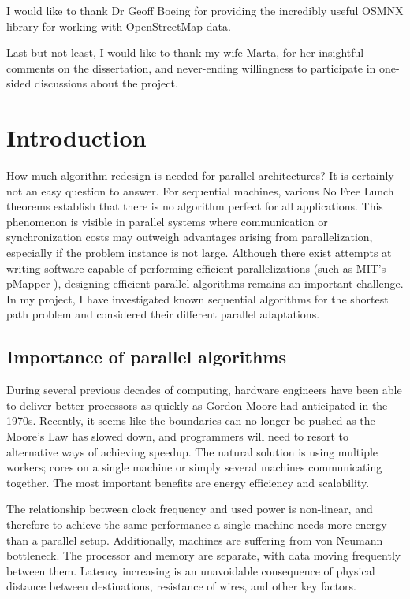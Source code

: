 \documentclass[12pt,a4paper,twoside,openright]{report}
\begin{document}
I would like to thank Dr Geoff Boeing for providing the incredibly useful OSMNX library for working with OpenStreetMap data\cite{Boeing2017}.

Last but not least, I would like to thank my wife Marta, for her insightful comments on the dissertation, and never-ending willingness to participate in one-sided discussions about the project.

\tableofcontents

\pagestyle{headings}
\chapter{Introduction}
How much algorithm redesign is needed for parallel architectures? It is certainly not an easy question to answer. For sequential machines, various No Free Lunch theorems \cite{free-lunch} establish that there is no algorithm perfect for all applications. This phenomenon is  visible in parallel systems where communication or synchronization costs may outweigh advantages arising from parallelization, especially if the problem instance is not large. Although there exist attempts at writing software capable of performing efficient parallelizations (such as MIT's pMapper \cite{pmapper}), designing efficient parallel algorithms remains an important challenge. In my project, I have investigated known sequential algorithms for the shortest path problem and considered their different parallel adaptations.

\section{Importance of parallel algorithms}
During several previous decades of computing, hardware engineers have been able to deliver better processors as quickly as Gordon Moore had anticipated in the 1970s. Recently, it seems like the boundaries can no longer be pushed as the Moore's Law has slowed down\cite{moore-law}, and programmers will need to resort to alternative ways of achieving speedup. The natural solution is using multiple workers; cores on a single machine or simply several machines communicating together. The most important benefits are energy efficiency and scalability. 

The relationship between clock frequency and used power is non-linear, and therefore to achieve the same performance a single machine needs more energy than a parallel setup. Additionally, machines are suffering from von Neumann bottleneck. The processor and memory are separate, with data moving frequently between them. Latency increasing is an unavoidable consequence of physical distance between destinations, resistance of wires, and other key factors. 
\end{document}
